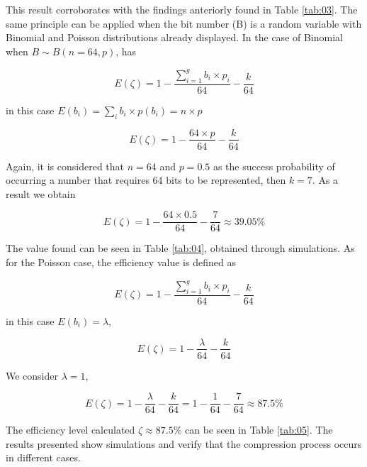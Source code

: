 \documentclass[10pt]{article}
\begin{document}
This result corroborates with the findings anteriorly found in Table \ref{tab:03}. The same principle can be applied when the bit number (B) is a random variable with Binomial and Poisson distributions already displayed. In the case of Binomial when $B \sim B(n=64,p)$, has

\begin{equation}\label{eq:46}
 E(\zeta) = 1 - \frac{\sum_{i=1}^{g}  b_i \times p_i }{64} - \frac{k}{64} 
\end{equation}

\noindent in this case $E(b_i) = \sum_{i} b_i \times p(b_i) = n \times p$

\begin{equation}\label{eq:47}
 E(\zeta) = 1 - \frac{64 \times p }{64} - \frac{k}{64} 
\end{equation}

Again, it is considered that $n=64$ and $p=0.5$ as the success probability of occurring a number that requires 64 bits to be represented, then $k=7$. As a result we obtain

\begin{equation}\label{eq:48}
 E(\zeta) = 1 - \frac{64 \times 0.5 }{64} - \frac{7}{64} \approx 39.05\%
\end{equation}

The value found can be seen in Table \ref{tab:04}, obtained through simulations. As for the Poisson case, the efficiency value is defined as

\begin{equation}\label{eq:49}
 E(\zeta) = 1 - \frac{\sum_{i=1}^{g}  b_i \times p_i }{64} - \frac{k}{64} 
\end{equation}

\noindent in this case $E(b_i) = \lambda$,

\begin{equation}\label{eq:50}
 E(\zeta) = 1 - \frac{\lambda}{64} - \frac{k}{64} 
\end{equation}

We consider $\lambda = 1$, 

\begin{equation}\label{eq:51}
 E(\zeta) = 1 - \frac{\lambda}{64} - \frac{k}{64}  = 1 - \frac{1}{64} - \frac{7}{64} \approx 87.5\%
\end{equation}

The efficiency level calculated $\zeta \approx 87.5\%$ can be seen in Table \ref{tab:05}. The results presented show simulations and verify that the compression process occurs in different cases.
\end{document}
